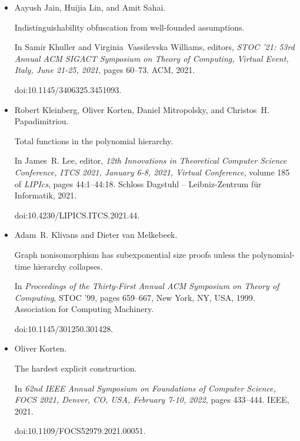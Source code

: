 \begin{itemize}
\item[] 
[17]

Aayush Jain, Huijia Lin, and Amit Sahai.


Indistinguishability obfuscation from well-founded assumptions.


In Samir Khuller and Virginia Vassilevska Williams, editors, \emph{STOC ’21: 53rd Annual ACM SIGACT Symposium on Theory of Computing,
Virtual Event, Italy, June 21-25, 2021}, pages 60–73. ACM, 2021.


doi:10.1145/3406325.3451093.





\item[] 
[18]

Robert Kleinberg, Oliver Korten, Daniel Mitropolsky, and Christos H.
Papadimitriou.


Total functions in the polynomial hierarchy.


In James R. Lee, editor, \emph{12th Innovations in Theoretical
Computer Science Conference, ITCS 2021, January 6-8, 2021, Virtual
Conference}, volume 185 of \emph{LIPIcs}, pages 44:1–44:18. Schloss Dagstuhl
– Leibniz-Zentrum für Informatik, 2021.


doi:10.4230/LIPICS.ITCS.2021.44.





\item[] 
[19]

Adam R. Klivans and Dieter van Melkebeek.


Graph nonisomorphism has subexponential size proofs unless the
polynomial-time hierarchy collapses.


In \emph{Proceedings of the Thirty-First Annual ACM Symposium on
Theory of Computing}, STOC ’99, pages 659–667, New York, NY, USA, 1999.
Association for Computing Machinery.


doi:10.1145/301250.301428.





\item[] 
[20]

Oliver Korten.


The hardest explicit construction.


In \emph{62nd IEEE Annual Symposium on Foundations of Computer
Science, FOCS 2021, Denver, CO, USA, February 7-10, 2022}, pages 433–444.
IEEE, 2021.


doi:10.1109/FOCS52979.2021.00051.






\end{itemize}
